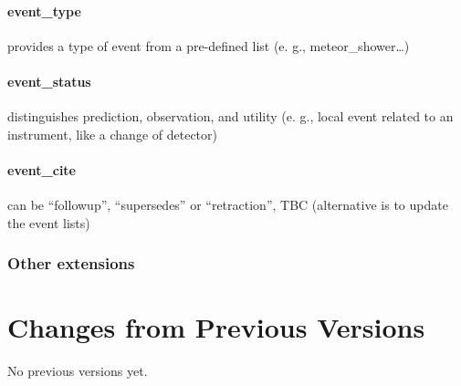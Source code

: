 \documentclass[11pt,a4paper]{ivoa}
\begin{document}
\paragraph{event\_type}

provides a type of event from a pre-defined list (e. g., meteor\_shower…)

\paragraph{event\_status}

distinguishes prediction, observation, and utility (e. g., local event related to an instrument, like a change of detector)

\paragraph{event\_cite}

can be ``followup'', ``supersedes'' or ``retraction'', TBC (alternative is to update the event lists)

\subsubsection{Other extensions\\}



\appendix
\section{Changes from Previous Versions}

No previous versions yet.  



\end{document}
